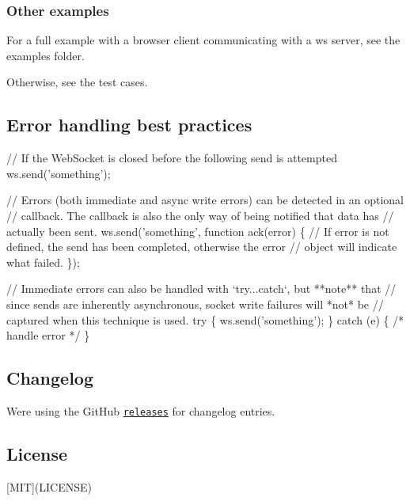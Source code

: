 

\subsubsection*{Other examples}

For a full example with a browser client communicating with a ws server, see the examples folder.

Otherwise, see the test cases.

\subsection*{Error handling best practices}


\begin{DoxyCode}
// If the WebSocket is closed before the following send is attempted
ws.send('something');

// Errors (both immediate and async write errors) can be detected in an optional
// callback. The callback is also the only way of being notified that data has
// actually been sent.
ws.send('something', function ack(error) \{
  // If error is not defined, the send has been completed, otherwise the error
  // object will indicate what failed.
\});

// Immediate errors can also be handled with `try...catch`, but **note** that
// since sends are inherently asynchronous, socket write failures will *not* be
// captured when this technique is used.
try \{ ws.send('something'); \}
catch (e) \{ /* handle error */ \}
\end{DoxyCode}


\subsection*{Changelog}

We\textquotesingle{}re using the Git\+Hub \href{https://github.com/websockets/ws/releases}{\tt {\ttfamily releases}} for changelog entries.

\subsection*{License}

\mbox{[}M\+IT\mbox{]}(L\+I\+C\+E\+N\+SE) 